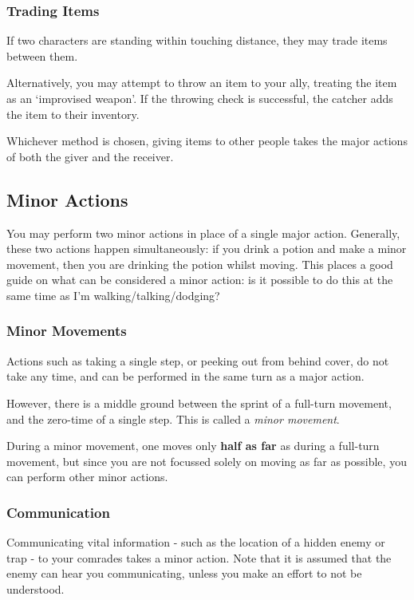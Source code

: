 \subsubsection{Trading Items}

If two characters are standing within touching distance, they may trade items between them. 

Alternatively, you may attempt to throw an item to your ally, treating the item as an `improvised weapon'. If the throwing check is successful, the catcher adds the item to their inventory. 

Whichever method is chosen, giving items to other people takes the major actions of both the giver and the receiver. 


\subsection{Minor Actions}
You may perform two minor actions in place of a single major action. Generally, these two actions happen simultaneously: if you drink a potion and make a minor movement, then you are drinking the potion whilst moving. This places a good guide on what can be considered a minor action: is it possible to do this at the same time as I'm walking/talking/dodging? 

\subsubsection{Minor Movements}

Actions such as taking a single step, or peeking out from behind cover, do not take any time, and can be performed in the same turn as a major action. 

However, there is a middle ground between the sprint of a full-turn movement, and the zero-time of a single step. This is called a {\it minor movement}. 

During a minor movement, one moves only {\bf half as far} as during a full-turn movement, but since you are not focussed solely on moving as far as possible, you can perform other minor actions. 

\subsubsection{Communication}

Communicating vital information - such as the location of a hidden enemy or trap - to your comrades takes a minor action. Note that it is assumed that the enemy can hear you communicating, unless you make an effort to not be understood. 

